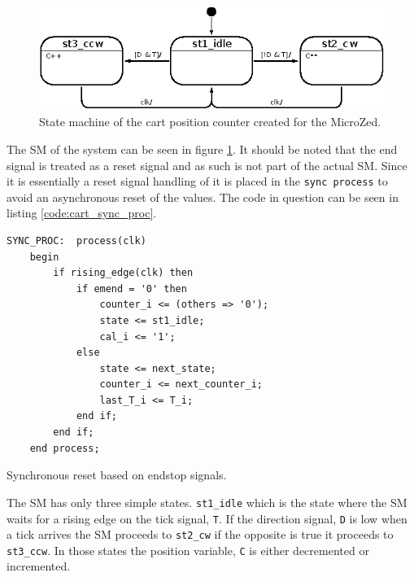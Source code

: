 \begin{figure}[h]
	\centering
	\includegraphics[width=.75\linewidth]{graphics/count_state_machine}
	\caption{State machine of the cart position counter created for the MicroZed.}
	\label{fig:countstatemachine}
\end{figure}

The SM of the system can be seen in figure \ref{fig:countstatemachine}.
It should be noted that the end signal is treated as a reset signal and as such is not part of the actual SM.
Since it is essentially a reset signal handling of it is placed in the \texttt{sync process} to avoid an asynchronous reset of the values.
The code in question can be seen in listing \ref{code:cart_sync_proc}.

\begin{listing}[H]
\begin{verbatim}
SYNC_PROC:  process(clk)
	begin
	    if rising_edge(clk) then
	        if emend = '0' then
	            counter_i <= (others => '0');
	            state <= st1_idle;
	            cal_i <= '1';
	        else
	            state <= next_state;
	            counter_i <= next_counter_i;
	            last_T_i <= T_i;
	        end if;
	    end if;
	end process;
\end{verbatim}
\caption{Synchronous reset based on endstop signals.}
\label{code:cart_sync_proc}
\end{listing}

The SM has only three simple states.
\texttt{st1\_idle} which is the state where the SM waits for a rising edge on the tick signal, \texttt{T}.
If the direction signal, \texttt{D} is low when a tick arrives the SM proceeds to \texttt{st2\_cw} if the opposite is true it proceeds to \texttt{st3\_ccw}.
In those states the position variable, \texttt{C} is either decremented or incremented.

